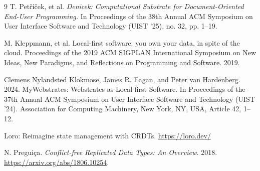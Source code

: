 \documentclass{article}
\begin{document}

\begin{thebibliography}{9}
T. Petříček, et al. \textit{Denicek: Computational Substrate for Document-Oriented End-User Programming.} In Proceedings of the 38th Annual ACM Symposium on User Interface Software and Technology (UIST '25). no. 32, pp. 1--19.

M. Kleppmann, et al. Local-first software: you own your data, in spite of the cloud. Proceedings of the 2019 ACM SIGPLAN International Symposium on New Ideas, New Paradigms, and Reflections on Programming and Software. 2019.

Clemens Nylandsted Klokmose, James R. Eagan, and Peter van Hardenberg. 2024. MyWebstrates: Webstrates as Local-first Software. In Proceedings of the 37th Annual ACM Symposium on User Interface Software and Technology (UIST '24). Association for Computing Machinery, New York, NY, USA, Article 42, 1–12.

Loro: Reimagine state management with CRDTs. \url{https://loro.dev/}

N. Preguiça. \textit{Conflict-free Replicated Data Types: An Overview.} 2018. \url{https://arxiv.org/abs/1806.10254}.

\end{thebibliography}
\end{document}
